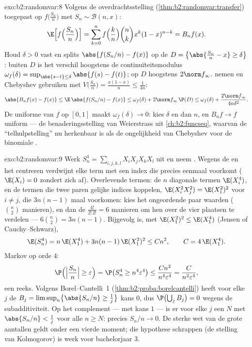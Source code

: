 \begin{solution}{exo:b2:randomvar:8}
Volgens de overdrachtsstelling
(\cref{thm:b2:randomvar:transfer}) toegepast op
$f\bigl(\frac{S_n}{n}\bigr)$ met $S_n \sim \mathcal{B}(n, x)$:
\[
\E\Bigl[f\Bigl(\frac{S_n}{n}\Bigr)\Bigr]
= \sum_{k=0}^n f\Bigl(\frac kn\Bigr)\binom nk x^k(1-x)^{n-k}
= B_nf(x) .
\]
Houd $\delta > 0$ vast en splits $\abs{f(S_n/n) - f(x)}$ op de
 $D = \bigl\{\abs{\frac{S_n}{n} - x} \geq
\delta\bigr\}$: buiten $D$ is het verschil hoogstens de
continuïteitsmodulus $\omega_f(\delta) = \sup_{\abs{s -
t}\leq\delta}\abs{f(s) - f(t)}$; op $D$ hoogstens $2\norm
f_\infty$.  nemen en Chebyshev gebruiken met
$V\bigl(\frac{S_n}{n}\bigr) = \frac{x(1-x)}{n} \leq \frac{1}{4n}$:
\[
\abs{B_nf(x) - f(x)}
\leq \E\,\abs{f(S_n/n) - f(x)}
\leq \omega_f(\delta)
+ 2\norm f_\infty\,\P(D)
\leq \omega_f(\delta) + \frac{2\norm f_\infty}{4n\delta^2} .
\]
De uniforme  van $f$ op $[0, 1]$ maakt
$\omega_f(\delta) \to 0$: kies $\delta$ en dan $n$, en $B_nf \to f$
uniform --- de benaderingsstelling van Weierstrass uit
\cref{ch:b2:funcseq}, waarvan de ``telhulpstelling'' nu herkenbaar
is als de ongelijkheid van Chebyshev voor de binomiale .
\end{solution}

\begin{solution}{exo:b2:randomvar:9}
Werk $S_n^4 = \sum_{i,j,k,l}X_iX_jX_kX_l$ uit en neem
. Wegens de  en het centreren
verdwijnt elke term met een index die precies eenmaal voorkomt
($\E(X_i) = 0$ zondert zich af). Overlevende termen: de $n$
diagonale termen $\E(X_i^4)$, en de termen die twee paren gelijke
indices koppelen, $\E(X_i^2X_j^2) = \E(X_1^2)^2$ voor $i \neq j$,
die $3n(n-1)$ maal voorkomen: kies het ongeordende paar waarden
($\binom n2$ manieren), en dan de $\frac{4!}{2!\,2!} = 6$ manieren
om hen over de vier plaatsen te verdelen --- $6\binom n2 =
3n(n-1)$. Bijgevolg is, met $\E(X_1^2)^2 \leq \E(X_1^4)$ (Jensen of
Cauchy--Schwarz),
\[
\E(S_n^4) = n\,\E(X_1^4) + 3n(n-1)\,\E(X_1^2)^2
\leq C n^2,
\qquad C = 4\,\E(X_1^4) .
\]
Markov op orde 4:
\[
\P\Bigl(\Bigl|\frac{S_n}{n}\Bigr| \geq \varepsilon\Bigr)
= \P\bigl(S_n^4 \geq n^4\varepsilon^4\bigr)
\leq \frac{Cn^2}{n^4\varepsilon^4}
= \frac{C}{n^2\varepsilon^4} ,
\]
een  reeks. Volgens Borel--Cantelli~1
(\cref{thm:b2:proba:borelcantelli}) heeft voor elke $j$ de
 $B_j = \limsup_n\bigl\{\abs{S_n/n} \geq
\frac1j\bigr\}$ kans $0$, dus $\P\bigl(\bigcup_j B_j\bigr) = 0$
wegens de  subadditiviteit. Op het complement --- met kans
$1$ --- is er voor elke $j$ een $N$ met $\abs{S_n/n} < \frac1j$
voor alle $n \geq N$: precies $S_n/n \to 0$. De sterke wet van de
grote aantallen geldt onder een vierde moment; die hypothese
schrappen (de stelling van Kolmogorov) is werk voor bachelorjaar 3.
\end{solution}

